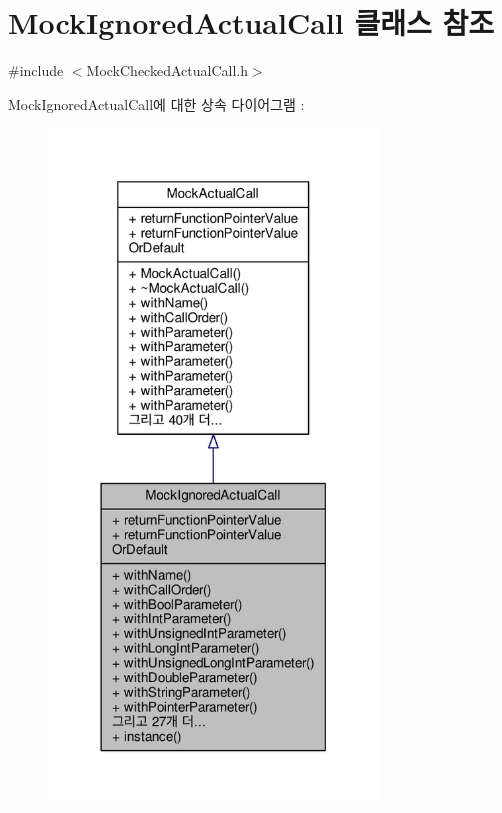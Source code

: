 \hypertarget{class_mock_ignored_actual_call}{}\section{Mock\+Ignored\+Actual\+Call 클래스 참조}
\label{class_mock_ignored_actual_call}


{\ttfamily \#include $<$Mock\+Checked\+Actual\+Call.\+h$>$}



Mock\+Ignored\+Actual\+Call에 대한 상속 다이어그램 \+: 
\nopagebreak
\begin{figure}[H]
\begin{center}
\leavevmode
\includegraphics[width=248pt]{class_mock_ignored_actual_call__inherit__graph}
\end{center}
\end{figure}


